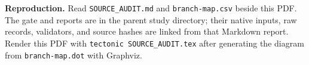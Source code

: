 \documentclass[10pt,a4paper]{article}
\begin{document}
\noindent\textbf{Reproduction.} Read \texttt{SOURCE\_AUDIT.md} and
\texttt{branch-map.csv} beside this PDF. The gate and reports are in the parent
study directory; their native inputs, raw records, validators, and source
hashes are linked from that Markdown report. Render this PDF with
\texttt{tectonic SOURCE\_AUDIT.tex} after generating the diagram from
\texttt{branch-map.dot} with Graphviz.
\end{document}
